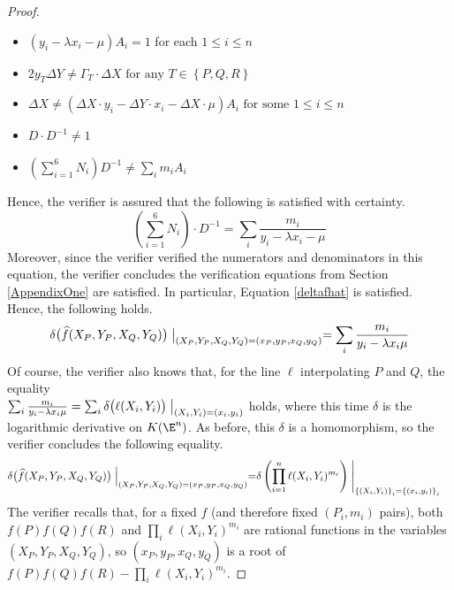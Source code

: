 \documentclass[11pt,letterpaper]{article}
\theoremstyle{definition}
\newcommand{\6}{\mathbf}
\newcommand{\7}{\mathcal}
\newcommand{\VerEquA}{2 y_T \Delta Y  \neq \Gamma_T \cdot \Delta X \text{ for any } T \in \left\{P,Q,R\right\}}
\newcommand{\VerEquB}{\Delta X \neq  (\Delta X \cdot y_i - \Delta Y \cdot x_i - \Delta X \cdot \mu) A_i \text{ for some }1 \leq i \leq n}
\newcommand{\VerEquC}{D \cdot D^{-1} \neq 1}
\newcommand{\VerEquD}{\left(\sum_{i=1}^{6} N_i\right) D^{-1} \neq \sum_i m_i A_i}
\begin{document}
\begin{proof}
\begin{itemize}
\item $(y_i - \lambda x_i - \mu)A_i = 1$ for each $1 \leq i \leq n$
\item $\VerEquA$
\item $\VerEquB$
\item $\VerEquC$
\item $\VerEquD$
\end{itemize}
Hence, the verifier is assured that the following is satisfied with certainty.
\[\left( \sum_{i = 1}^6 N_i \right) \cdot D^{-1} = \sum_i \frac{m_i}{y_i-\lambda x_i - \mu}\]
Moreover, since the verifier verified the numerators and denominators in this equation,  the verifier concludes the verification equations from Section \ref{AppendixOne} are satisfied.
In particular, Equation \ref{deltafhat} is satisfied.  Hence, the following holds.
$$\delta\big(\widehat{f}(X_P,Y_P,X_Q,Y_Q)\big) \bigm\vert_{(X_P,Y_P,X_Q,Y_Q)=(x_P,y_P,x_Q,y_Q)} = \sum_i \frac{m_i}{y_i-\lambda x_i \mu}$$
Of course, the verifier also knows that, for the line $\ell$ interpolating $P$ and $Q$, the equality \\
$\sum_i \frac{m_i}{y_i-\lambda x_i \mu} = \sum_i \delta\big(\ell(X_i,Y_i)\big) \bigm\vert_{(X_i,Y_i)=(x_i,y_i)}$ holds, where this time $\delta$ is the logarithmic derivative on $K(\E^n)$. As before, this $\delta$ is a homomorphism, so the verifier concludes the following equality.
\begin{align}
\delta\big(\widehat{f}(X_P,Y_P,X_Q,Y_Q)\big) \Bigm\vert_{(X_P,Y_P,X_Q,Y_Q)=(x_P,y_P,x_Q,y_Q)} =& \delta\left(\prod_{i=1}^{n} \ell(X_i,Y_i)^{m_i}\right) \Biggm\vert_{\left\{(X_i,Y_i)\right\}_i=\left\{(x_i,y_i)\right\}_i} \label{verfequality}
\end{align}
The verifier recalls that, for a fixed $f$ (and therefore fixed $(P_i, m_i)$ pairs), both $f(P)f(Q)f(R)$ and $\prod_i \ell(X_i,Y_i)^{m_i}$ are rational functions in the variables $(X_P, Y_P, X_Q, Y_Q)$, so $(x_P, y_P, x_Q, y_Q)$ is a root of $f(P)f(Q)f(R) - \prod_i \ell(X_i,Y_i)^{m_i}$. %

\end{proof}
\end{document}
